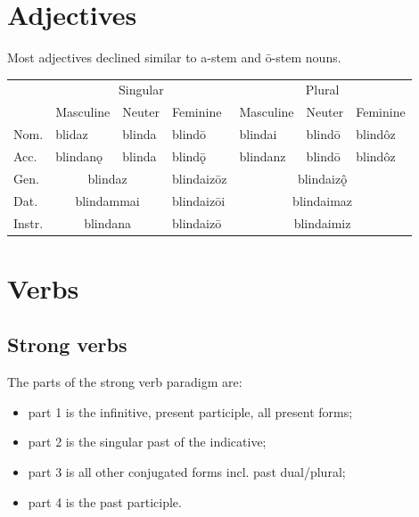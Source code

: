 \documentclass{article}
\newcommand\oon{ǫ̂}
\begin{document}
\section{Adjectives}

Most adjectives declined similar to a-stem and ō-stem nouns.


\begin{center}
\begin{tabular}{ | l | l l l l l l | }
\hline
& \multicolumn{3}{|c}{Singular}
& \multicolumn{3}{c|}{Plural} \\
& Masculine & Neuter & Feminine
& Masculine & Neuter & Feminine \\
\hline
Nom. & blidaz & blinda & blindō & blindai & blindō & blindôz \\
Acc. & blindanǫ & blinda & blindǭ & blindanz & blindō & blindôz \\
Gen. & \multicolumn{2}{|c}{blindaz} & blindaizōz & \multicolumn{3}{c|}{blindaiz\oon} \\
Dat. & \multicolumn{2}{|c}{blindammai} & blindaizōi & \multicolumn{3}{c|}{blindaimaz} \\
Instr. & \multicolumn{2}{|c}{blindana} & blindaizō & \multicolumn{3}{c|}{blindaimiz} \\
\hline
\end{tabular}
\end{center}

\section{Verbs}

\subsection{Strong verbs}

The parts of the strong verb paradigm are:

\begin{itemize}
\item{part 1 is the infinitive, present participle, all present forms;}
\item{part 2 is the singular past of the indicative;}
\item{part 3 is all other conjugated forms incl. past dual/plural;}
\item{part 4 is the past participle.}
\end{itemize}
\end{document}

